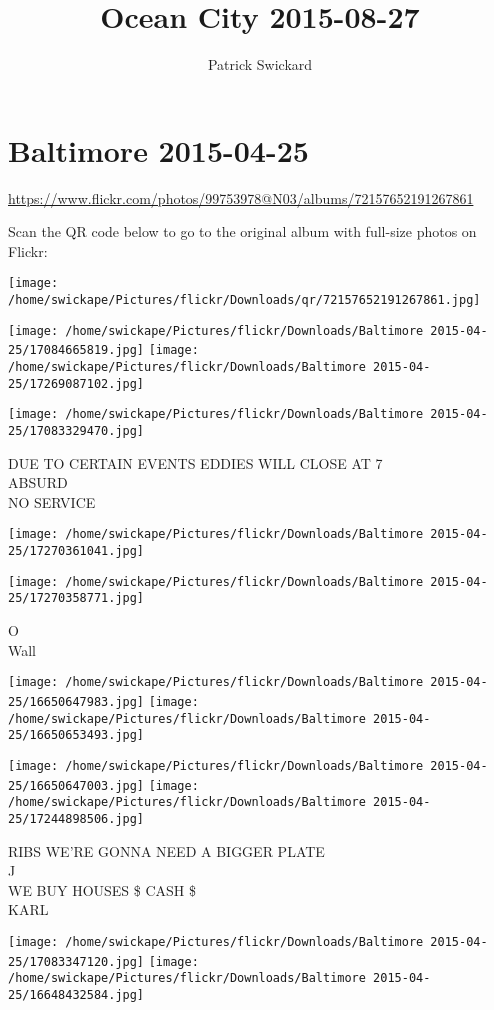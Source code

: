 \documentclass[10pt,letterpaper]{article}
\title{Ocean City 2015-08-27}
\author{Patrick Swickard}
\date{}
\begin{document}
\section*{Baltimore 2015-04-25}

\url{https://www.flickr.com/photos/99753978@N03/albums/72157652191267861}

Scan the QR code below to go to the original album with full-size photos on Flickr:

\texttt{[image: /home/swickape/Pictures/flickr/Downloads/qr/72157652191267861.jpg]}
\pagebreak

\texttt{[image: /home/swickape/Pictures/flickr/Downloads/Baltimore 2015-04-25/17084665819.jpg]}
\texttt{[image: /home/swickape/Pictures/flickr/Downloads/Baltimore 2015-04-25/17269087102.jpg]}

\texttt{[image: /home/swickape/Pictures/flickr/Downloads/Baltimore 2015-04-25/17083329470.jpg]}

DUE TO CERTAIN EVENTS EDDIES WILL CLOSE AT 7\\
ABSURD\\
NO SERVICE
\pagebreak

\texttt{[image: /home/swickape/Pictures/flickr/Downloads/Baltimore 2015-04-25/17270361041.jpg]}

\vspace{0.25in}
\texttt{[image: /home/swickape/Pictures/flickr/Downloads/Baltimore 2015-04-25/17270358771.jpg]}

O\\
Wall
\pagebreak

\texttt{[image: /home/swickape/Pictures/flickr/Downloads/Baltimore 2015-04-25/16650647983.jpg]}
\texttt{[image: /home/swickape/Pictures/flickr/Downloads/Baltimore 2015-04-25/16650653493.jpg]}

\texttt{[image: /home/swickape/Pictures/flickr/Downloads/Baltimore 2015-04-25/16650647003.jpg]}
\texttt{[image: /home/swickape/Pictures/flickr/Downloads/Baltimore 2015-04-25/17244898506.jpg]}

RIBS WE'RE GONNA NEED A BIGGER PLATE\\
J\\
WE BUY HOUSES \$ CASH \$\\
KARL
\pagebreak

\texttt{[image: /home/swickape/Pictures/flickr/Downloads/Baltimore 2015-04-25/17083347120.jpg]}
\texttt{[image: /home/swickape/Pictures/flickr/Downloads/Baltimore 2015-04-25/16648432584.jpg]}
\end{document}
